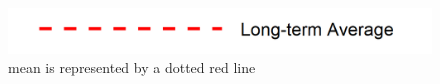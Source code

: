 \documentclass[
]{book}
\begin{document}
\begin{columns-nocenter}

\begin{column}

\begin{figure}
\includegraphics[width=15.25in]{figures/mline} \caption{mean is represented by a dotted red line}\label{fig:unnamed-chunk-69}
\end{figure}

\end{column}

\begin{column}

\end{column}

\begin{column}

\end{column}

\end{columns-nocenter}
\end{document}
